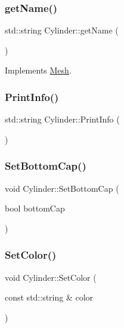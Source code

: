 \mbox{\label{class_cylinder_afdb7f76b3f02471d638c36127395d181}} 
\subsubsection{\texorpdfstring{getName()}{getName()}}
{\footnotesize\ttfamily std\+::string Cylinder\+::get\+Name (\begin{DoxyParamCaption}{ }\end{DoxyParamCaption})\hspace{0.3cm}{\ttfamily [virtual]}}



Implements \mbox{\hyperlink{class_mesh_aa131fe1c2586fe60988155db77c57272}{Mesh}}.

\mbox{\label{class_cylinder_ac61439519f076123be2ec3550ad34971}} 
\subsubsection{\texorpdfstring{PrintInfo()}{PrintInfo()}}
{\footnotesize\ttfamily std\+::string Cylinder\+::\+Print\+Info (\begin{DoxyParamCaption}{ }\end{DoxyParamCaption})}

\mbox{\label{class_cylinder_aacc8158ba918eed167fbfd43eadfe1b0}} 
\subsubsection{\texorpdfstring{SetBottomCap()}{SetBottomCap()}}
{\footnotesize\ttfamily void Cylinder\+::\+Set\+Bottom\+Cap (\begin{DoxyParamCaption}\item[{bool}]{bottom\+Cap }\end{DoxyParamCaption})}

\mbox{\label{class_cylinder_a314d27ef3a15767f8c4ff538827c9a4a}} 
\subsubsection{\texorpdfstring{SetColor()}{SetColor()}}
{\footnotesize\ttfamily void Cylinder\+::\+Set\+Color (\begin{DoxyParamCaption}\item[{const std\+::string \&}]{color }\end{DoxyParamCaption})}

